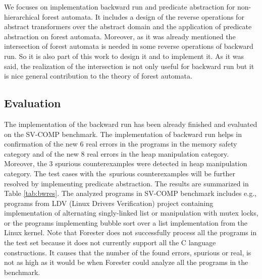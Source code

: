 \documentclass[fleqn,11pt]{ExcelAtFIT} %
\begin{document}
We focuses on implementation backward run and predicate abstraction
for non-hierarchical forest automata.
It includes a design of the reverse operations for abstract transformers over
the abstract domain and the application of predicate abstraction on forest automata.
Moreover, as it was already mentioned the intersection of forest automata is needed in some reverse
operations of backward run.
So it is also part of this work to design it and to implement it.
As it was said, the realization of the intersection is not only useful for backward run but
it is nice general contribution to the theory of forest automata.

\begin{comment}
We mentioned that this work implements either backward run and predicate abstraction only for
non-hierarchical forest automata.
Such extension for hierarchical forest automata is definitely a challenging issue for future work
that will be done next after finishing the implementation of basic predicate abstraction.
\end{comment}

\subsection{Evaluation}

The implementation of the backward run has been already finished and evaluated on the SV-COMP benchmark.
The implementation of backward run helps in confirmation of the new $6$ real errors in the programs in the memory safety category and
of the new $8$ real errors in the heap manipulation category.
Moreover, the $3$ spurious counterexamples were detected in heap manipulation category.
The test cases with the~spurious counterexamples will be further resolved by implementing predicate
abstraction.
The results are summarized in Table \ref{tab:bwres}.
The analyzed programs in SV-COMP benchmark includes e.g., programs from LDV (Linux Drivers Verification) project
containing implementation of alternating singly-linked list or manipulation with mutex locks, or the programs
implementing bubble sort over a list implementation from the Linux kernel.
Note that Forester does not successfully process all the programs in the test set
because it does not currently support all the C language constructions.
It causes that the number of the found errors, spurious or real, is not as high as it would be when
Forester could analyze all the programs in the benchmark.
\end{document}
